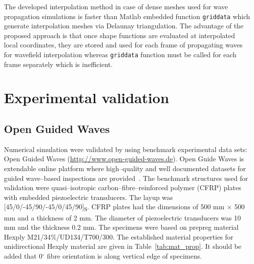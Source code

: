 \documentclass[preprint,12pt]{elsarticle}
\begin{document}
	The developed interpolation method in case of dense meshes used for wave propagation simulations is faster than Matlab embedded function \verb|griddata| which generate interpolation meshes via Delaunay triangulation. The advantage of the proposed approach is that once shape functions are evaluated at interpolated local coordinates, they are stored and used for each frame of propagating waves for wavefield interpolation whereas  \verb|griddata| function must be called for each frame separately which is inefficient.

	\section{Experimental validation}
	\subsection{Open Guided Waves}
	Numerical simulation were validated by using benchmark experimental data sets: Open Guided Waves (\url{http://www.open-guided-waves.de}). Open Guide Waves is extendable online platform where high--quality and well documented datasets for guided wave--based inspections are provided~\cite{Moll2018}. The benchmark structures used for validation were quasi--isotropic carbon--fibre--reinforced polymer (CFRP) plates with embedded piezoelectric transducers. The layup was [45/0/-45/90/-45/0/45/90]\textsubscript{S}. CFRP plates had the dimensions of 500 mm $\times$ 500 mm and a thickness of 2 mm. The diameter of piezoelectric transducers was 10 mm and the thickness 0.2 mm. The specimens were based on prepreg material Hexply\textsuperscript{\textregistered} M21/34\%/UD134/T700/300. The established material properties for unidirectional Hexply material are given in Table~\ref{tab:mat_prop}. It should be added that 0$^{\circ}$ fibre orientation is along vertical edge of specimens.
	
\end{document}
